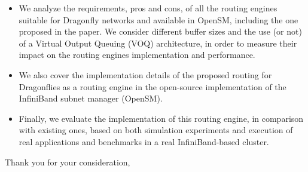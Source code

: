 \documentclass[a4paper,10pt]{letter}
\begin{document}
\begin{letter}
\begin{itemize}
\item We analyze the requirements, pros and cons, of all the routing engines suitable for Dragonfly networks and available in OpenSM, including the one proposed in the paper. We consider different buffer sizes and the use (or not) of a Virtual Output Queuing (VOQ) architecture, in order to measure their impact on the routing engines implementation and performance.

\item We also cover the implementation details of the proposed routing for Dragonflies as a routing engine in the open-source implementation of the InfiniBand subnet manager (OpenSM).

\item Finally, we evaluate the implementation of this routing engine, in comparison with existing ones, based on both simulation experiments and execution of real applications and benchmarks in a real InfiniBand-based cluster.


\end{itemize}

\closing{Thank you for your consideration,}


\end{letter}
\end{document}
